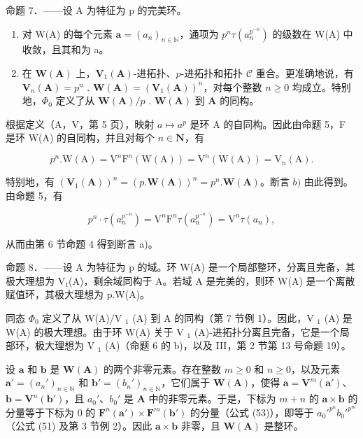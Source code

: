 命题 7．——设 A 为特征为 p 的完美环。

\begin{enumerate}
\def\labelenumi{\alph{enumi})}
\item
  对 W(A) 的每个元素 \(\boldsymbol{a} = (a_{n})_{n \in \mathbb{N}}\)，通项为 \(p^{n}\tau(a_{n}^{p^{-n}})\) 的级数在 W(A) 中收敛，且其和为 a。
\item
  在 \(\mathbf{W}(\mathbf{A})\) 上，\(\mathbf{V}_1(\mathbf{A})\)-进拓扑、\(p\)-进拓扑和拓扑 \(\mathcal{C}\) 重合。更准确地说，有 \(\mathbf{V}_n(\mathbf{A}) = p^n\) . \(\mathbf{W}(\mathbf{A}) = (\mathbf{V}_1(\mathbf{A}))^n\)，对每个整数 \(n \geqslant 0\) 均成立。特别地，\(\Phi_0\) 定义了从 \(\mathbf{W}(\mathbf{A})/p\) . \(\mathbf{W}(\mathbf{A})\) 到 \(\mathbf{A}\) 的同构。
\end{enumerate}

根据定义（A，V，第 5 页），映射 \(a \mapsto a^{p}\) 是环 A 的自同构。因此由命题 5，F 是环 W(A) 的自同构，并且对每个 \(n \in \mathbf{N}\)，有

\[
p ^ {n}. \mathrm{W} (\mathrm{A}) = \mathrm{V} ^ {n} \mathrm{F} ^ {n} (\mathrm{W} (\mathrm{A})) = \mathrm{V} ^ {n} (\mathrm{W} (\mathrm{A})) = \mathrm{V} _ {n} (\mathrm{A}).
\]

特别地，有 \((\mathbf{V}_1(\mathbf{A}))^n = (p.\mathbf{W}(\mathbf{A}))^n = p^n.\mathbf{W}(\mathbf{A})\)。断言 \(b)\) 由此得到。由命题 5，有

\[
p ^ {n} \cdot \tau (a _ {n} ^ {p ^ {- n}}) = \mathrm{V} ^ {n} \mathrm{F} ^ {n} \tau (a _ {n} ^ {p ^ {- n}}) = \mathrm{V} ^ {n} \tau (a _ {n}),
\]

从而由第 6 节命题 4 得到断言 a)。

命题 8．——设 A 为特征为 p 的域。环 W(A) 是一个局部整环，分离且完备，其极大理想为 V₁(A)，剩余域同构于 A。若域 A 是完美的，则环 W(A) 是一个离散赋值环，其极大理想为 p.W(A)。

同态 \(\Phi_{0}\) 定义了从 W(A)/V \(_{1}\) (A) 到 A 的同构（第 7 节例 1）。因此，V \(_{1}\) (A) 是 W(A) 的极大理想。由于环 W(A) 关于 V \(_{1}\) (A)-进拓扑分离且完备，它是一个局部环，极大理想为 V \(_{1}\) (A)（命题 6 的 b)，以及 III，第 2 节第 13 号命题 19）。

设 \(\pmb{a}\) 和 \(\pmb{b}\) 是 \(\mathbf{W}(\mathbf{A})\) 的两个非零元素。存在整数 \(m \geqslant 0\) 和 \(n \geqslant 0\)，以及元素 \(\pmb{a}' = (a_n')_{n \in \mathbb{N}}\) 和 \(\pmb{b}' = (b_n')_{n \in \mathbb{N}}\)，它们属于 \(\mathbf{W}(\mathbf{A})\)，使得 \(\pmb{a} = \mathbf{V}^m(\pmb{a}')\)、\(\pmb{b} = \mathbf{V}^n(\pmb{b}')\)，且 \(a_0'\)、\(b_0'\) 是 \(\mathbf{A}\) 中的非零元素。于是，下标为 \(m + n\) 的 \(\pmb{a} \times \pmb{b}\) 的分量等于下标为 0 的 \(\mathbf{F}^n(\pmb{a}') \times \mathbf{F}^m(\pmb{b}')\) 的分量（公式 (53)），即等于 \(a_0'^{p^n} b_0'^{p^m}\)（公式 (51) 及第 3 节例 2）。因此 \(\pmb{a} \times \pmb{b}\) 非零，且 \(\mathbf{W}(\mathbf{A})\) 是整环。

